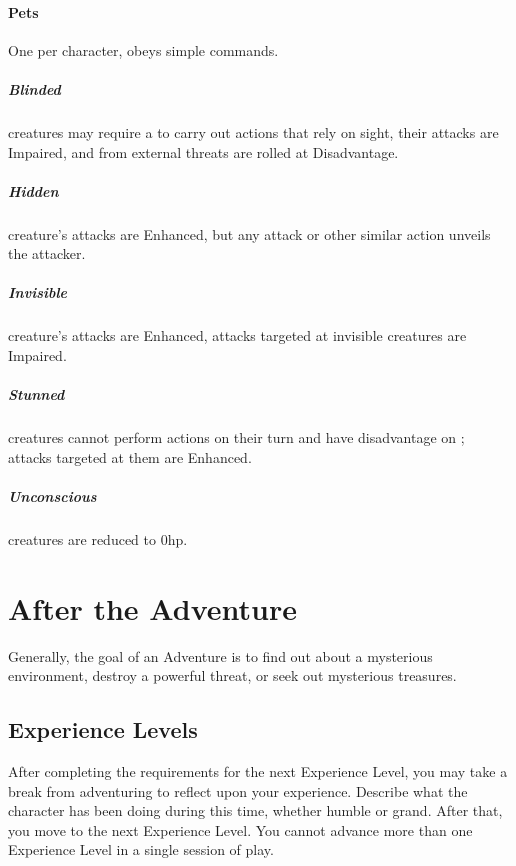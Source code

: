 \documentclass[itdr]{subfiles}
\begin{document}
\vfill
\paragraph{Pets}
One per character, obeys simple commands.

\vfill
{}

\subparagraph{Blinded} creatures may require a  to carry out actions that rely on sight, their attacks are Impaired, and  from external threats are rolled at Disadvantage.

\vfill
{}
\subparagraph{Hidden} creature's attacks are Enhanced, but any attack or other similar action unveils the attacker.

\vfill
{}
\subparagraph{Invisible} creature's attacks are Enhanced, attacks targeted at invisible creatures are Impaired.

\vfill
{}
\subparagraph{Stunned} creatures cannot perform actions on their turn and have disadvantage on ; attacks targeted at them are Enhanced.

\vfill
{}
\subparagraph{Unconscious} creatures are reduced to 0hp.

\vfill
\break

\section{After the Adventure}

Generally, the goal of an Adventure is to find out about a mysterious environment, destroy a powerful threat, or seek out mysterious treasures.

\subsection{Experience Levels}
After completing the requirements for the next Experience Level, you may take a break from adventuring to reflect upon your experience. Describe what the character has been doing during this time, whether humble or grand. After that, you move to the next Experience Level. You cannot advance more than one Experience Level in a single session of play.
\end{document}
